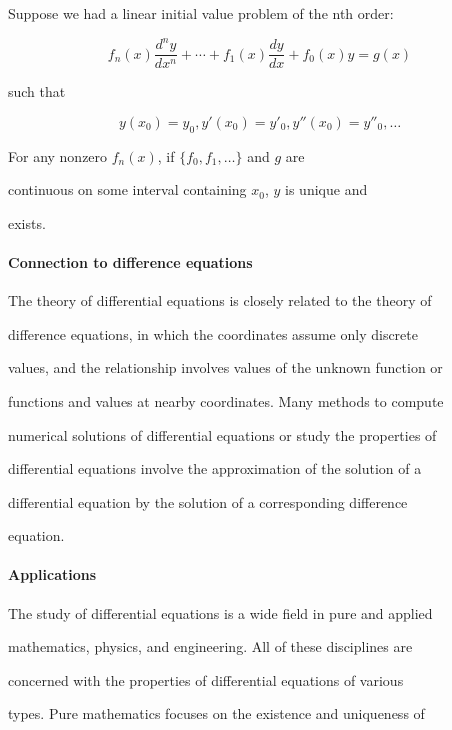 Suppose we had a linear initial value problem of the nth order:



$$f_{n}(x)\frac{d^n y}{dx^n} + \cdots + f_{1}(x)\frac{d y}{dx} + f_{0}(x)y = g(x)$$

such that



$$y(x_{0})=y_{0}, y'(x_{0}) = y'_{0}, y''(x_{0}) = y''_{0}, \ldots$$



For any nonzero $f_{n}(x)$, if $\{f_{0},f_{1},\ldots\}$ and $g$ are

continuous on some interval containing $x_{0}$, $y$ is unique and

exists.



\paragraph{Connection to difference equations}



The theory of differential equations is closely related to the theory of

difference equations, in which the coordinates assume only discrete

values, and the relationship involves values of the unknown function or

functions and values at nearby coordinates. Many methods to compute

numerical solutions of differential equations or study the properties of

differential equations involve the approximation of the solution of a

differential equation by the solution of a corresponding difference

equation.



\paragraph{Applications}



The study of differential equations is a wide field in pure and applied

mathematics, physics, and engineering. All of these disciplines are

concerned with the properties of differential equations of various

types. Pure mathematics focuses on the existence and uniqueness of

